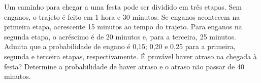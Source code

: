 %
%


\begin{exercicioBanco}[\valorquestao]
Um caminho para chegar a uma festa pode ser dividido em três etapas. Sem enganos, o trajeto é feito em 1 hora e 30 minutos. Se enganos acontecem na primeira etapa, acrescente 15 minutos ao tempo do trajeto. Para enganos na segunda etapa, o acréscimo é de 20 minutos e, para a terceira, 25 minutos. Admita que a probabilidade de engano é 0,15; 0,20 e 0,25 para a primeira, segunda e terceira etapas, respectivamente. É provável haver atraso na chegada à festa? Determine a probabilidade de haver atraso e o atraso não passar de 40 minutos.
\end{exercicioBanco}


